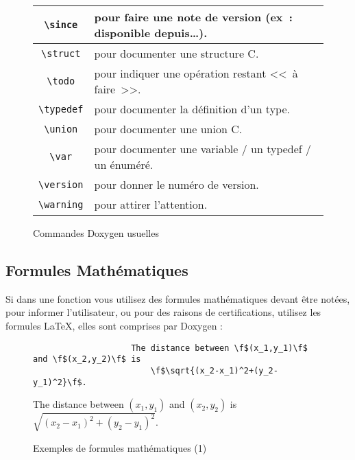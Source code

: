 \begin{figure}[H]
\begin{changemargin}{-2.5cm}{-2.5cm}
\begin{tabular}{@{\extracolsep{\fill}} | c || l | }
					\verb+\since+ & pour faire une note de version (ex : disponible depuis\dots). \\ \hline
					\verb+\struct+ & pour documenter une structure C. \\ \hline
					\verb+\todo+ & pour indiquer une opération restant << à faire >>. \\ \hline
					\verb+\typedef+ & pour documenter la définition d'un type. \\ \hline
					\verb+\union+ & pour documenter une union C. \\ \hline
					\verb+\var+ & pour documenter une variable / un typedef / un énuméré. \\ \hline
					\verb+\version+ & pour donner le numéro de version. \\ \hline
					\verb+\warning+ & pour attirer l'attention. \\ \hline
				\end{tabular}
				\end{changemargin}
				\caption{Commandes Doxygen usuelles}
			\end{figure}

		\subsection{Formules Mathématiques}
			Si dans une fonction vous utilisez des formules mathématiques devant être notées, pour informer l'utilisateur, ou pour des raisons de certifications, utilisez les formules \LaTeX, elles sont comprises par Doxygen :

			\begin{figure}[H]
				\begin{changemargin}{-2.5cm}{-2.5cm}
				\begin{tcolorbox}
				\begin{verbatim}
					The distance between \f$(x_1,y_1)\f$ and \f$(x_2,y_2)\f$ is 
					    \f$\sqrt{(x_2-x_1)^2+(y_2-y_1)^2}\f$.
				\end{verbatim}
				\end{tcolorbox}
				\end{changemargin}

				\begin{changemargin}{-2.5cm}{-2.5cm}
				\begin{tcolorbox}
					The distance between $(x_1,y_1)$ and $(x_2,y_2)$ is $\sqrt{(x_2-x_1)^2+(y_2-y_1)^2}$.
				\end{tcolorbox}
				\end{changemargin}
				\caption{Exemples de formules mathématiques (1)}
			\end{figure}

